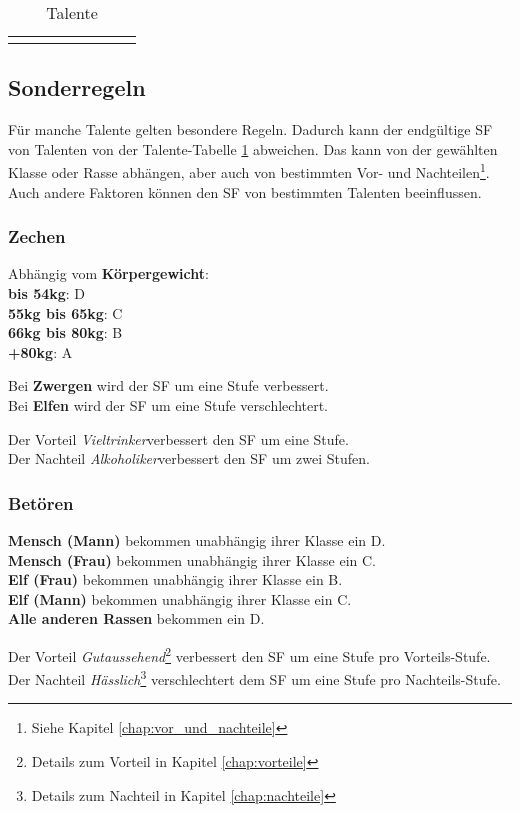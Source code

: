 \begin{center}
\begin{longtable}{|l|c|c|c|c|c|c|c|}
\hline
\caption{Talente}
\label{tab:Talente}
\end{longtable}
\end{center}

\subsection{Sonderregeln}
\label{chap:sonderregeln}
Für manche Talente gelten besondere Regeln. Dadurch kann der endgültige SF von Talenten von der Talente-Tabelle \ref{tab:Talente} abweichen. Das kann von der gewählten Klasse oder Rasse abhängen, aber auch von bestimmten Vor- und Nachteilen\footnote{Siehe Kapitel \ref{chap:vor_und_nachteile}}. Auch andere Faktoren können den SF von bestimmten Talenten beeinflussen.

\subsubsection{Zechen}
Abhängig vom \textbf{Körpergewicht}: \\
\textbf{bis 54kg}: D \\
\textbf{55kg bis 65kg}: C \\
\textbf{66kg bis 80kg}: B \\
\textbf{+80kg}: A

Bei \textbf{Zwergen} wird der SF um eine Stufe verbessert. \\
Bei \textbf{Elfen} wird der SF um eine Stufe verschlechtert. 

Der Vorteil \textit{Vieltrinker}\footnotemark[4] verbessert den SF um eine Stufe. \\
Der Nachteil \textit{Alkoholiker}\footnotemark[5] verbessert den SF um zwei Stufen. 

\subsubsection{Betören}
\textbf{Mensch (Mann)} bekommen unabhängig ihrer Klasse ein D. \\
\textbf{Mensch (Frau)} bekommen unabhängig ihrer Klasse ein C. \\
\textbf{Elf (Frau)} bekommen unabhängig ihrer Klasse ein B. \\
\textbf{Elf (Mann)} bekommen unabhängig ihrer Klasse ein C. \\
\textbf{Alle anderen Rassen} bekommen ein D. 

Der Vorteil \textit{Gutaussehend}\footnote{Details zum Vorteil in Kapitel \ref{chap:vorteile}} verbessert den SF um eine Stufe pro Vorteils-Stufe. \\
Der Nachteil \textit{Hässlich}\footnote{Details zum Nachteil in Kapitel \ref{chap:nachteile}} verschlechtert dem SF um eine Stufe pro Nachteils-Stufe. 

